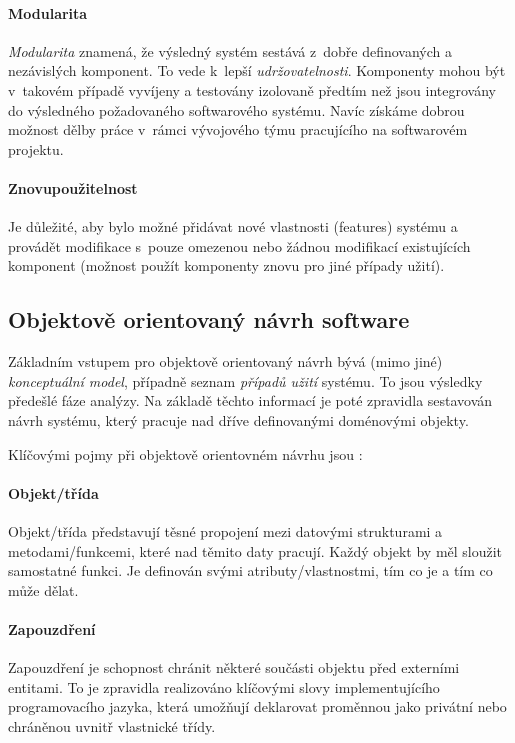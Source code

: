 \paragraph{Modularita} \emph{Modularita} znamená, že výsledný systém sestává z~dobře definovaných a nezávislých komponent. To vede k~lepší \emph{udržovatelnosti}. Komponenty mohou být v~takovém případě vyvíjeny a testovány izolovaně předtím než jsou integrovány do výsledného požadovaného softwarového systému. Navíc získáme dobrou možnost dělby práce v~rámci vývojového týmu pracujícího na softwarovém projektu.

\paragraph{Znovupoužitelnost} Je důležité, aby bylo možné přidávat nové vlastnosti (features) systému a provádět modifikace s~pouze omezenou nebo žádnou modifikací existujících komponent (možnost použít komponenty znovu pro jiné případy užití).

\subsection{Objektově orientovaný návrh software}
Základním vstupem pro objektově orientovaný návrh bývá (mimo jiné) \emph{konceptuální model}, případně seznam \emph{případů užití} systému. To jsou výsledky předešlé fáze analýzy. Na základě těchto informací je poté zpravidla sestavován návrh systému, který pracuje nad dříve definovanými doménovými objekty.

Klíčovými pojmy při objektově orientovném návrhu jsou \cite{wiki:oop_design}:

\paragraph{Objekt/třída}  Objekt/třída představují těsné propojení mezi datovými strukturami a metodami/funkcemi, které nad těmito daty pracují. Každý objekt by měl sloužit samostatné funkci. Je definován svými atributy/vlastnostmi, tím co je a tím co může dělat.
\paragraph{Zapouzdření} Zapouzdření je schopnost chránit některé součásti objektu před externími entitami. To je zpravidla realizováno klíčovými slovy implementujícího programovacího jazyka, která umožňují deklarovat proměnnou jako privátní nebo chráněnou uvnitř vlastnické třídy.
